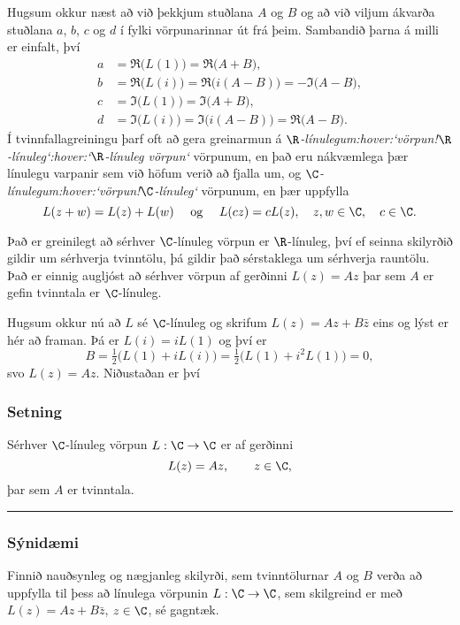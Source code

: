 Hugsum okkur næst að við þekkjum stuðlana  $A$ og $B$ og
að við viljum ákvarða stuðlana $a$, $b$, $c$ og $d$ í 
fylki vörpunarinnar út frá þeim. Sambandið þarna á milli er
einfalt, því
\begin{align*}
a&=\Re\big(L(1)\big)=\Re\big(A+B\big), \\
b&=\Re\big(L(i)\big)=\Re\big(i(A-B)\big)=-\Im\big(A-B\big),\\
c&=\Im\big(L(1)\big)=\Im\big(A+B\big),\\
d&=\Im\big(L(i)\big)=\Im\big(i(A-B)\big)=\Re\big(A-B\big).
\end{align*}
Í tvinnfallagreiningu þarf oft að gera greinarmun á {\it
$\R$-línulegum:hover:`vörpun!$\R$-línuleg`:hover:`$\R$-línuleg vörpun`}
vörpunum, en það eru nákvæmlega þær línulegu varpanir sem við höfum
verið að fjalla um, og {\it $\C$-línulegum:hover:`vörpun!$\C$-línuleg`} vörpunum, en þær uppfylla
\begin{equation*}
L(z+w)=L(z)+L(w) \quad \text{ og } \quad 
L(cz)=cL(z), \quad z,w\in \C, \quad c\in \C.
\end{equation*}


Það er greinilegt að sérhver $\C$-línuleg vörpun er $\R$-línuleg, því ef
seinna skilyrðið gildir um sérhverja tvinntölu, þá gildir það sérstaklega um
sérhverja rauntölu.  Það er einnig augljóst að sérhver vörpun af
gerðinni $L(z)=Az$ þar sem $A$ er gefin tvinntala er $\C$-línuleg.


Hugsum okkur nú að $L$ sé $\C$-línuleg og skrifum
$L(z)=Az+B\bar z$ eins og lýst er hér að framan.  Þá er 
$L(i)=iL(1)$ og því er 
$$
B=\tfrac 12\big(L(1)+iL(i)\big)= \tfrac 12\big(L(1)+i^2L(1)\big)=0,
$$
svo $L(z)=Az$.  Niðustaðan er því 

\subsubsection{Setning} Sérhver $\C$-línuleg vörpun $L:\C\to \C$ er af gerðinni
$$
L(z)=Az, \qquad z\in \C,
$$
þar sem $A$ er tvinntala.


\bigskip\hrule\bigskip

\subsubsection{Sýnidæmi}  Finnið nauðsynleg og nægjanleg skilyrði, sem tvinntölurnar
$A$ og $B$ verða að uppfylla til þess að línulega vörpunin
$L:\C\to\C$,  sem skilgreind er með $L(z)=Az+B\bar z$, $z\in \C$,
sé gagntæk.  

